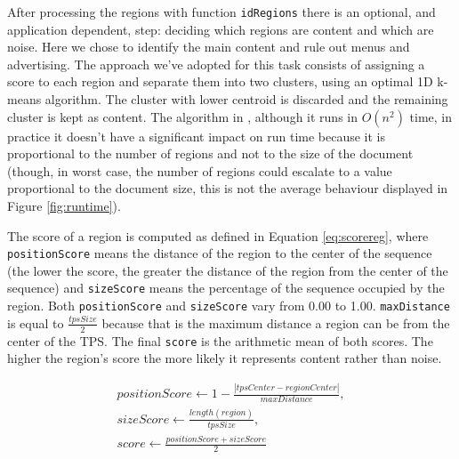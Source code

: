 After processing the regions with function \texttt{idRegions} there is an
optional, and application dependent, step: deciding which regions are content
and which are noise. Here we chose to identify the main content and rule out
menus and advertising. The approach we've adopted for this task consists of
assigning a score to each region and separate them into two clusters, using an
optimal 1D k-means algorithm\cite{1dkmeans2011}. The cluster with lower centroid
is discarded and the remaining cluster is kept as content. The algorithm in
\cite{1dkmeans2011}, although it runs in $O(n^2)$ time, in practice it doesn't
have a significant impact on run time because it is proportional to the number
of regions and not to the size of the document (though, in worst case, the
number of regions could escalate to a value proportional to the document size,
this is not the average behaviour displayed in Figure \ref{fig:runtime}).

The score of a region is computed as defined in Equation \ref{eq:scorereg},
where \texttt{positionScore} means the distance of the region to the center of
the sequence (the lower the score, the greater the distance of the region from
the center of the sequence) and \texttt{sizeScore} means the percentage of the
sequence occupied by the region. Both \texttt{positionScore} and
\texttt{sizeScore} vary from 0.00 to 1.00. \texttt{maxDistance} is equal to
$\frac{tpsSize}{2}$ because that is the maximum distance a region can be from
the center of the TPS. The final \texttt{score} is the arithmetic mean of both
scores. The higher the region's score the more likely it represents content
rather than noise.

\vspace{-0.2cm}

\begin{small}
\begin{equation}\label{eq:scorereg}
\begin{split}
positionScore \leftarrow 1-\frac{|tpsCenter - regionCenter|}{maxDistance}, \\
sizeScore \leftarrow \frac{length(region)}{tpsSize},\\
score \leftarrow \frac{positionScore+sizeScore}{2}
\end{split}
\end{equation}
\end{small}

\vspace{-0.2cm}

